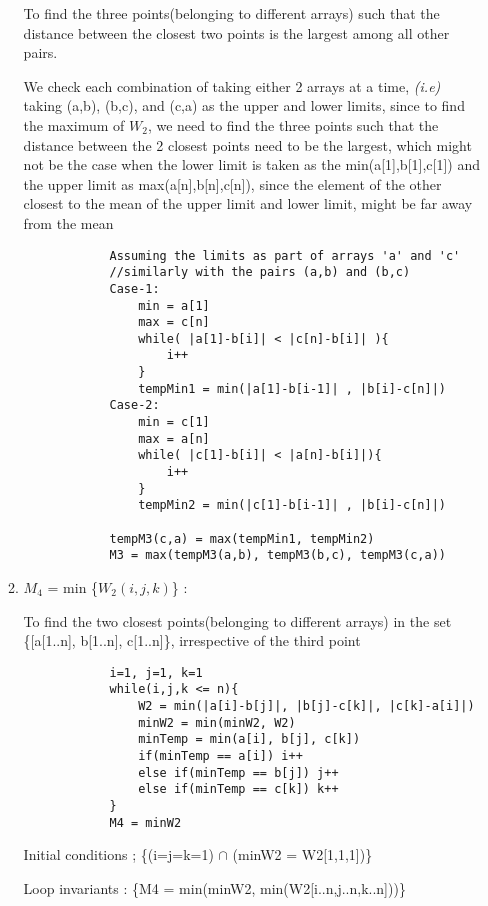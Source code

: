 \documentclass[12pt]{article}
\begin{document}
\begin{enumerate}
\begin{enumerate}
        
        To find the three points(belonging to different arrays) such that the distance between the closest two points is the largest among all other pairs.
        
        We check each combination of taking either 2 arrays at a time, \textit{(i.e)} taking (a,b), (b,c), and (c,a) as the upper and lower limits, since to find the maximum of $W_2$, we need to find the three points such that the distance between the 2 closest points need to be the largest, which might not be the case when the lower limit is taken as the min(a[1],b[1],c[1]) and the upper limit as max(a[n],b[n],c[n]), since the element of the other closest to the mean of the upper limit and lower limit, might be far away from the mean 
        \begin{verbatim}
            Assuming the limits as part of arrays 'a' and 'c'
            //similarly with the pairs (a,b) and (b,c)
            Case-1: 
                min = a[1]
                max = c[n]
                while( |a[1]-b[i]| < |c[n]-b[i]| ){
                    i++
                }
                tempMin1 = min(|a[1]-b[i-1]| , |b[i]-c[n]|)
            Case-2:
                min = c[1]
                max = a[n]
                while( |c[1]-b[i]| < |a[n]-b[i]|){
                    i++
                }
                tempMin2 = min(|c[1]-b[i-1]| , |b[i]-c[n]|)
                
            tempM3(c,a) = max(tempMin1, tempMin2)
            M3 = max(tempM3(a,b), tempM3(b,c), tempM3(c,a))
        \end{verbatim}
        \item $M_4$ = min \{$W_2(i,j,k)$\} : 
        
        To find the two closest points(belonging to different arrays) in the set \{[a[1..n], b[1..n], c[1..n]\}, irrespective of the third point
        \begin{verbatim}
            i=1, j=1, k=1
            while(i,j,k <= n){
                W2 = min(|a[i]-b[j]|, |b[j]-c[k]|, |c[k]-a[i]|)
                minW2 = min(minW2, W2)
                minTemp = min(a[i], b[j], c[k])
                if(minTemp == a[i]) i++
                else if(minTemp == b[j]) j++
                else if(minTemp == c[k]) k++
            }
            M4 = minW2
        \end{verbatim}
        Initial conditions ; \{(i=j=k=1) $\cap$ (minW2 = W2[1,1,1])\}
        
        Loop invariants : \{M4 = min(minW2, min(W2[i..n,j..n,k..n]))\}
        

\end{enumerate}
\end{enumerate}
\end{document}
